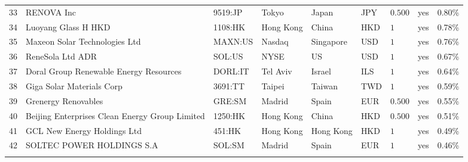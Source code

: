\documentclass[11pt]{article}
\begin{document}
\begin{appendices}
\begin{landscape}
\begin{longtable}{ *{9}{l} }
33 & RENOVA Inc & 9519:JP & Tokyo & Japan & JPY & $0.500$ & yes & 0.80\% \\ 
34 & Luoyang Glass H HKD & 1108:HK & Hong Kong & China & HKD & $1$ & yes & 0.78\% \\ 
35 & Maxeon Solar Technologies Ltd & MAXN:US & Nasdaq & Singapore & USD & $1$ & yes & 0.76\% \\ 
36 & ReneSola Ltd ADR & SOL:US & NYSE & US & USD & $1$ & yes & 0.67\% \\ 
37 & Doral Group Renewable Energy Resources & DORL:IT & Tel Aviv & Israel & ILS & $1$ & yes & 0.64\% \\ 
38 & Giga Solar Materials Corp & 3691:TT & Taipei & Taiwan & TWD & $1$ & yes & 0.59\% \\ 
39 & Grenergy Renovables & GRE:SM & Madrid & Spain & EUR & $0.500$ & yes & 0.55\% \\ 
40 & Beijing Enterprises Clean Energy Group Limited & 1250:HK & Hong Kong & China & HKD & $0.500$ & yes & 0.51\% \\ 
41 & GCL New Energy Holdings Ltd & 451:HK & Hong Kong & Hong Kong & HKD & $1$ & yes & 0.49\% \\ 
42 & SOLTEC POWER HOLDINGS S.A & SOL:SM & Madrid & Spain & EUR & $1$ & yes & 0.46\% \\ 
\hline \\[-1.8ex] 
\end{longtable} 

\end{landscape}
\newpage


\end{appendices}
\end{document}
